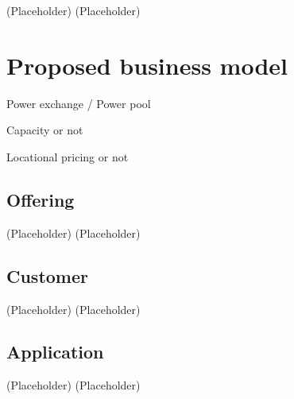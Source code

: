 (Placeholder)
\newpage
(Placeholder)
\newpage

\section{Proposed business model}
Power exchange / Power pool

Capacity or not

Locational pricing or not
\subsection{Offering}
(Placeholder)
\newpage
(Placeholder)
\newpage
\subsection{Customer}
(Placeholder)
\newpage
(Placeholder)
\newpage
\subsection{Application}
(Placeholder)
\newpage
(Placeholder)
\newpage





